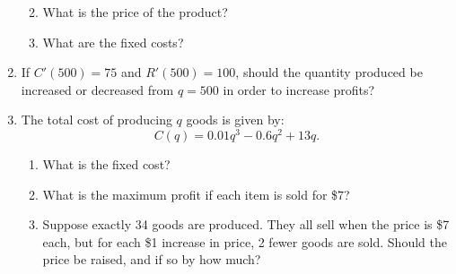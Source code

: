 \documentclass[11pt]{article}
\begin{document}
\begin{enumerate}
\begin{enumerate}
    \vfill

  \item What is the price of the product?

    \vfill

  \item What are the fixed costs?

    \vfill
    
  \end{enumerate}

\item If $C'(500) = 75$ and $R'(500) = 100$, should the quantity
  produced be increased or decreased from $q = 500$ in order to
  increase profits?

  \vfill\vfill

  \newpage

\item The total cost of producing $q$ goods is given by:
  \[
  C(q) = 0.01q^3 - 0.6q^2 + 13q.
  \]
  \begin{enumerate}
  \item What is the fixed cost?

    \vfill

  \item What is the maximum profit if each item is sold for \$7?

    \vfill

  \item Suppose exactly 34 goods are produced. They all sell when the
    price is \$7 each, but for each \$1 increase in price, 2 fewer
    goods are sold. Should the price be raised, and if so by how much?

    \vfill
    
  \end{enumerate}

\end{enumerate}
\end{document}
